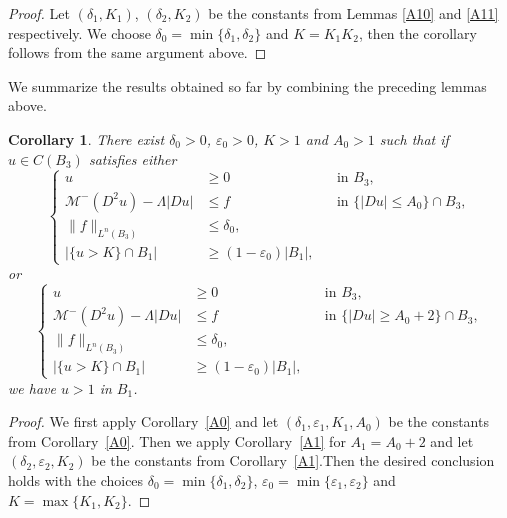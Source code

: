 \documentclass[11pt]{amsart}
\theoremstyle{plain}
\newtheorem{corollary}[theorem]{Corollary}
\theoremstyle{definition}
\numberwithin{equation}{section}
\begin{document}
\begin{proof}
    Let $(\delta_1,K_1)$, $(\delta_2,K_2)$ be the constants from Lemmas \ref{A10} and \ref{A11} respectively.
    We choose $\delta_0 = \min\{\delta_1,\delta_2\}$ and $K=K_1 K_2$, then the corollary follows from  the same argument above.
\end{proof}

We summarize the results obtained so far by combining the preceding lemmas above.
\begin{corollary} \label{meas}
    There exist $\delta_0>0$, $\varepsilon_0>0$, $K>1$ and $A_0>1$ such that if $u \in C(B_3)$ satisfies either
    \begin{equation*}
    \left\{
    \begin{aligned}
            u &\geq 0 &&\text{in } B_3,\\
            \mathcal{M}^-(D^2u)-\Lambda|Du| &\leq f &&\text{in } \{|Du| \leq A_0\}\cap B_3,\\
            \|f\|_{L^n(B_3)} &\leq \delta_0, \\
            |\{u>K\} \cap B_1| &\geq (1-\varepsilon_0)|B_1|,
    \end{aligned}
    \right.
    \end{equation*}
    or
    \begin{equation*}
    \left\{
        \begin{aligned}
            u &\geq 0 &&\text{in } B_3,\\
            \mathcal{M}^-(D^2u)-\Lambda|Du| &\leq f &&\text{in } \{|Du| \geq A_0+2\}\cap B_3,\\
            \|f\|_{L^n(B_3)} &\leq \delta_0, \\
            |\{u>K\} \cap B_1| &\geq (1-\varepsilon_0)|B_1|,
        \end{aligned}
        \right.
    \end{equation*}   
    we have $u>1$ in $B_1$.
\end{corollary}

\begin{proof}
    We first apply Corollary~\ref{A0} and let $(\delta_1, \varepsilon_1, K_1, A_0)$ be the constants from Corollary~\ref{A0}. Then we apply Corollary~\ref{A1} for $A_1=A_0+2$ and let $(\delta_2, \varepsilon_2, K_2)$ be the constants from Corollary~\ref{A1}.Then the desired conclusion holds with the choices $\delta_0=\min\{\delta_1, \delta_2\}$, $\varepsilon_0=\min\{\varepsilon_1, \varepsilon_2\}$ and $K=\max\{K_1, K_2\}$.
\end{proof}
\end{document}
